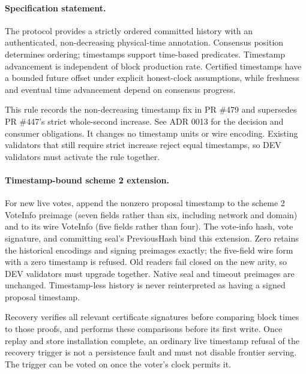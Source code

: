 \paragraph{Specification statement.}
The protocol provides a strictly ordered committed history with an
authenticated, non-decreasing physical-time annotation. Consensus position
determines ordering; timestamps support time-based predicates. Timestamp
advancement is independent of block production rate. Certified timestamps have
a bounded future offset under explicit honest-clock assumptions, while
freshness and eventual time advancement depend on consensus progress.

This rule records the non-decreasing timestamp fix in PR \#479 and supersedes
PR \#447's strict whole-second increase. See ADR 0013 for the decision and
consumer obligations. It changes no timestamp units or wire encoding. Existing
validators that still require strict increase reject equal timestamps, so DEV
validators must activate the rule together.

\paragraph{Timestamp-bound scheme 2 extension.}
For new live votes, append the nonzero proposal timestamp to the scheme 2
VoteInfo preimage (seven fields rather than six, including network and domain)
and to its wire VoteInfo (five fields rather than four). The vote-info hash,
vote signature, and committing seal's PreviousHash bind this extension. Zero
retains the historical encodings and signing preimages exactly; the five-field
wire form with a zero timestamp is refused. Old readers fail closed on the new
arity, so DEV validators must upgrade together. Native seal and timeout
preimages are unchanged. Timestamp-less history is never reinterpreted as
having a signed proposal timestamp.

Recovery verifies all relevant certificate signatures before comparing block
times to those proofs, and performs these comparisons before its first write.
Once replay and store installation complete, an ordinary live timestamp refusal
of the recovery trigger is not a persistence fault and must not disable frontier
serving. The trigger can be voted on once the voter's clock permits it.
